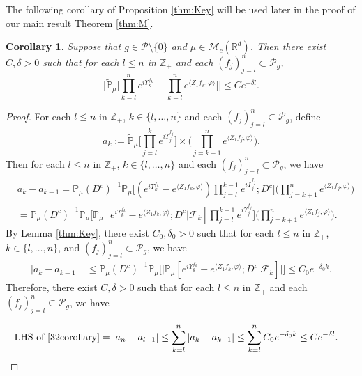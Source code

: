 \documentclass[12pt,a4paper]{amsart}
\theoremstyle{plain}
\newtheorem{cor}[thm]{Corollary}
\theoremstyle{definition}
\numberwithin{equation}{section}
\begin{document}
The following corollary of Proposition \ref{thm:Key} will be used later in the proof of our main result Theorem \ref{thm:M}.
\begin{cor}
  \label{cor:MI}
  Suppose that $g\in \mathcal{P}\setminus\{0\}$ and $\mu\in \mathcal M_c(\mathbb R^d)$.
  Then there exist $C,\delta>0$ such that for each $l\leq n$ in $\mathbb Z_+$ and each $(f_j)_{j=l}^n\subset \mathcal P_g$,
\begin{equation}
  \label{32corollary}
  \Big|\mathbb{\widetilde{P}}_{\mu}\Big[\prod_{k=l}^ne^{i \Upsilon^{f_k}_{k} }-\prod_{k=l}^n e^{\langle Z_1f_k, \varphi\rangle}\Big]\Big|\leq C e^{-\delta l}.
\end{equation}
\end{cor}
\begin{proof}
  For each $l\leq n$ in $\mathbb Z_+$, $k \in \{l,\dots,n\}$ and each $(f_j)_{j=l}^n\subset \mathcal P_g$, define
  \[
    a_k
    :=  \mathbb{\widetilde{P}}_{\mu}\Big[\prod_{j=l}^{k} e^{i\Upsilon_j^{f_j}}\Big] \times \Big(\prod_{j=k+1}^{n} e^{ \langle Z_1f_j,\varphi \rangle} \Big).
  \]
  Then for each $l\leq n$ in $\mathbb Z_+$, $k \in \{l,\dots,n\}$ and each $(f_j)_{j=l}^n\subset \mathcal P_g$, we have
  \begin{align}
    & a_{k} - a_{k-1}
      =\mathbb{P}_{\mu}(D^c)^{-1} \mathbb{P}_{\mu}\Big[(e^{i\Upsilon^{f_k}_k}-e^{\langle Z_1f_k, \varphi\rangle})\prod_{j=l}^{k-1} e^{i\Upsilon_j^{f_j}};D^c\Big] \Big(\prod_{j=k+1}^n e^{\langle Z_1f_j, \varphi\rangle}\Big)\\
    & =\mathbb{P}_{\mu}(D^c)^{-1} \mathbb{P}_{\mu}\Big[\mathbb P_\mu[e^{i\Upsilon_k^{f_k}}-e^{\langle Z_1f_k, \varphi \rangle}; D^c|\mathscr F_k] \prod_{j=l}^{k-1} e^{i\Upsilon_j^{f_j}}\Big] \Big(\prod_{j=k+1}^{n}e^{\langle Z_1f_j, \varphi\rangle}\Big).
  \end{align}
  By Lemma \ref{thm:Key}, there exist $C_0,\delta_0 >0$ such that
   for each $l\leq n$ in $\mathbb Z_+$,  $k \in \{l,\dots , n\}$, and $(f_j)_{j=l}^n\subset \mathcal P_g$, we have
  \begin{align}
    | a_{k} - a_{k-1}|
    & \leq \mathbb{P}_{\mu}(D^c)^{-1}\mathbb{P}_{\mu}\Big[\big|\mathbb P_\mu[e^{i\Upsilon_k^{f_k}}-e^{\langle Z_1f_k, \varphi \rangle}; D^c | \mathscr{F}_k]\big|\Big]
    \leq C_0 e^{-\delta_0 k}.
  \end{align}
    Therefore, there exist $C,\delta >0$ such that
   for each $l\leq n$ in $\mathbb Z_+$ and each $(f_j)_{j=l}^n\subset \mathcal P_g$, we have

  \begin{align}
    \text{LHS of \eqref{32corollary}}
    & = \left|a_n-a_{l-1}\right|
    \leq \sum_{k=l}^n\left|a_{k}-a_{k-1}\right|
    \leq \sum_{k=l}^n C_0 e^{-\delta_0 k}
         \leq C e^{- \delta l}.
      \qedhere
  \end{align}
\end{proof}
\end{document}
